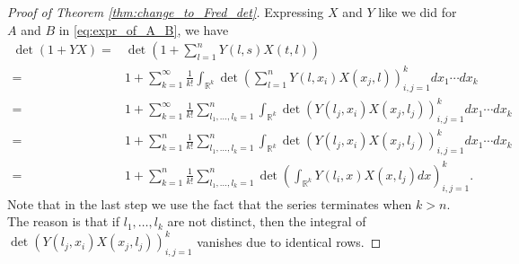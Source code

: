 \documentclass[11pt, a4paper]{article}
\numberwithin{equation}{section}
\newcommand{\realR}{\mathbb{R}}
\theoremstyle{definition}
\theoremstyle{remark}
\begin{document}
\begin{proof}[Proof of Theorem \ref{thm:change_to_Fred_det}]
  Expressing $X$ and $Y$ like we did for $A$ and $B$ in \eqref{eq:expr_of_A_B}, we have
  \begin{equation} \label{eq:Fred_det_expanded}
    \begin{split}
      \det(1 + YX) = {}& \det \left( 1 + \sum^n_{l = 1} Y(l, s) X(t, l) \right) \\
      = {}& 1 + \sum^{\infty}_{k = 1} \frac{1}{k!} \int_{\realR^k} \det \left( \sum^n_{l = 1} Y(l, x_i) X(x_j, l) \right)^k_{i, j = 1} dx_1 \dotsm dx_k \\
      = {}& 1 + \sum^{\infty}_{k = 1} \frac{1}{k!} \sum^n_{l_1, \dotsc, l_k = 1} \int_{\realR^k} \det(Y(l_j, x_i) X(x_j, l_j))^k_{i, j = 1} dx_1 \dotsm dx_k \\
      = {}& 1 + \sum^n_{k = 1} \frac{1}{k!} \sum^n_{l_1, \dotsc, l_k = 1} \int_{\realR^k} \det(Y(l_j, x_i) X(x_j, l_j))^k_{i, j = 1} dx_1 \dotsm dx_k \\
      = {}& 1 + \sum^n_{k = 1} \frac{1}{k!} \sum^n_{l_1, \dotsc, l_k = 1} \det \left( \int_{\realR^k} Y(l_i, x) X(x, l_j) dx \right)^k_{i, j = 1}.
    \end{split}
  \end{equation}
  Note that in the last step we use the fact that the series terminates when $k > n$. The reason is that if $l_1, \dotsc, l_k$ are not distinct, then the integral of $\det(Y(l_j, x_i) X(x_j, l_j))^k_{i, j = 1}$ vanishes due to identical rows.


\end{proof}
\end{document}
